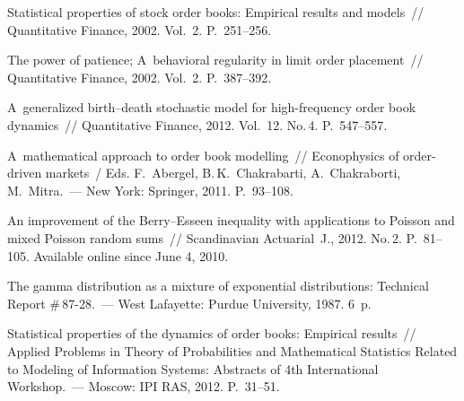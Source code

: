 \begin{multicols}{2}
{{\begin{thebibliography}{99}
Statistical properties of stock order books: Empirical results and
models~// Quantitative Finance, 2002. Vol.~2. P.~251--256.

 The power of patience;
A~behavioral regularity in limit order placement~// Quantitative
Finance, 2002. Vol.~2. P.~387--392.

A~generalized birth--death stochastic model for high-frequency order book dynamics~// 
Quantitative Finance, 2012. Vol.~12. No.\,4. P.~547--557.

 A~mathematical approach to order book modelling~//
Econophysics of order-driven markets~/ Eds.
F.~Abergel, B.\,K.~Chakrabarti, A.~Chakraborti, M.~Mitra.~--- New York: Springer, 2011.
P.~93--108.

 An improvement of the Berry--Esseen
inequality with applications to Poisson and mixed Poisson random
sums~// Scandinavian Actuarial~J., 2012. No.\,2. P.~81--105.
Available online since June 4, 2010.

The gamma distribution as a mixture of exponential
distributions: Technical Report \#\,87-28.~--- West Lafayette: Purdue
University, 1987. 6~p.




\label{end\stat}

 Statistical
properties of the dynamics of order books: Empirical results~//
Applied Problems in Theory of Probabilities and Mathematical
Statistics Related to Modeling of Information Systems: Abstracts of
4th International Workshop.~--- Moscow: IPI RAS, 2012. P.~31--51.

\end{thebibliography}
}
}

\end{multicols}